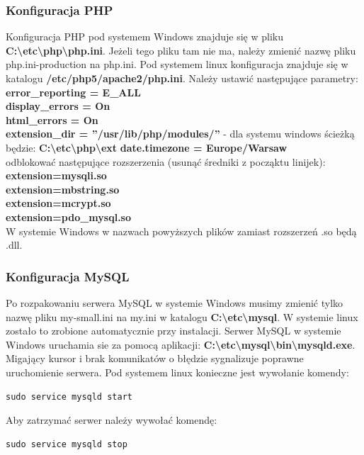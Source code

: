 \documentclass[a4paper,10pt]{article}
\begin{document}
\subsubsection{Konfiguracja PHP}
Konfiguracja PHP pod systemem Windows znajduje się w pliku \textbf{C:\textbackslash etc\textbackslash php\textbackslash php.ini}. Jeżeli tego pliku tam nie ma, należy zmienić nazwę pliku php.ini-production na php.ini. Pod systemem linux konfiguracja znajduje się w katalogu \textbf{/etc/php5/apache2/php.ini}. Należy ustawić następujące parametry:\\
\textbf{error\_reporting = E\_ALL} \\
\textbf{display\_errors = On} \\
\textbf{html\_errors = On} \\
\textbf{extension\_dir = ''/usr/lib/php/modules/''} - dla systemu windows ścieżką będzie: \textbf{C:\textbackslash etc\textbackslash php\textbackslash ext}
\textbf{date.timezone = Europe/Warsaw} \\%
odblokować następujące rozszerzenia (usunąć średniki z począktu linijek): \\
\textbf{extension=mysqli.so\\
extension=mbstring.so\\
extension=mcrypt.so\\
extension=pdo\_mysql.so\\}
W systemie Windows w nazwach powyższych plików zamiast rozszerzeń .so będą .dll.
\subsubsection{Konfiguracja MySQL}
Po rozpakowaniu serwera MySQL w systemie Windows musimy zmienić tylko nazwę pliku \linebreak my-small.ini na my.ini w katalogu \textbf{C:\textbackslash etc\textbackslash mysql}. W systemie linux zostało to zrobione automatycznie przy instalacji. Serwer MySQL w systemie Windows uruchamia sie za pomocą aplikacji: \linebreak \textbf{C:\textbackslash etc\textbackslash mysql\textbackslash bin\textbackslash mysqld.exe}. Migający kursor i brak komunikatów o błędzie sygnalizuje poprawne uruchomienie serwera. Pod systemem linux konieczne jest wywołanie komendy: \\
\begin{verbatim}
sudo service mysqld start
\end{verbatim}
Aby zatrzymać serwer należy wywołać komendę: \\
\begin{verbatim}
sudo service mysqld stop
\end{verbatim}
\end{document}
